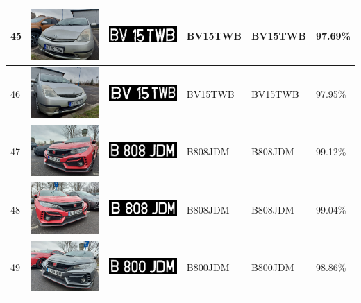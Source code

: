 \documentclass[a4paper,12pt]{report}
\begin{document}
\begin{longtable}{| m{0.6cm} | m{3cm} | m{3cm} | m{1.8cm} | m{1.8cm} | m{1.8cm} |}
        45 & \includegraphics[width=3cm,keepaspectratio]{dataset/26_d1.jpg} & \includegraphics[width=3cm,keepaspectratio]{segmentari/45.jpg} & BV15TWB & BV15TWB & 97.69\% \\ \hline
        46 & \includegraphics[width=3cm,keepaspectratio]{dataset/26_s1.jpg} & \includegraphics[width=3cm,keepaspectratio]{segmentari/46.jpg} & BV15TWB & BV15TWB & 97.95\% \\ \hline
        47 & \includegraphics[width=3cm,keepaspectratio]{dataset/27_d1.jpg} & \includegraphics[width=3cm,keepaspectratio]{segmentari/47.jpg} & B808JDM & B808JDM & 99.12\% \\ \hline
        48 & \includegraphics[width=3cm,keepaspectratio]{dataset/27_s1.jpg} & \includegraphics[width=3cm,keepaspectratio]{segmentari/48.jpg} & B808JDM & B808JDM & 99.04\% \\ \hline
        49 & \includegraphics[width=3cm,keepaspectratio]{dataset/28_d1.jpg} & \includegraphics[width=3cm,keepaspectratio]{segmentari/49.jpg} & B800JDM & B800JDM & 98.86\% \\ \hline

\end{longtable}
\end{document}
